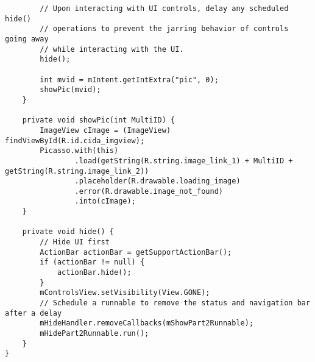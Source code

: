 \begin{lstlisting}
        // Upon interacting with UI controls, delay any scheduled hide()
        // operations to prevent the jarring behavior of controls going away
        // while interacting with the UI.
        hide();

        int mvid = mIntent.getIntExtra("pic", 0);
        showPic(mvid);
    }

    private void showPic(int MultiID) {
        ImageView cImage = (ImageView) findViewById(R.id.cida_imgview);
        Picasso.with(this)
                .load(getString(R.string.image_link_1) + MultiID + getString(R.string.image_link_2))
                .placeholder(R.drawable.loading_image)
                .error(R.drawable.image_not_found)
                .into(cImage);
    }

    private void hide() {
        // Hide UI first
        ActionBar actionBar = getSupportActionBar();
        if (actionBar != null) {
            actionBar.hide();
        }
        mControlsView.setVisibility(View.GONE);
        // Schedule a runnable to remove the status and navigation bar after a delay
        mHideHandler.removeCallbacks(mShowPart2Runnable);
        mHidePart2Runnable.run();
    }
}
\end{lstlisting}
\newpage
